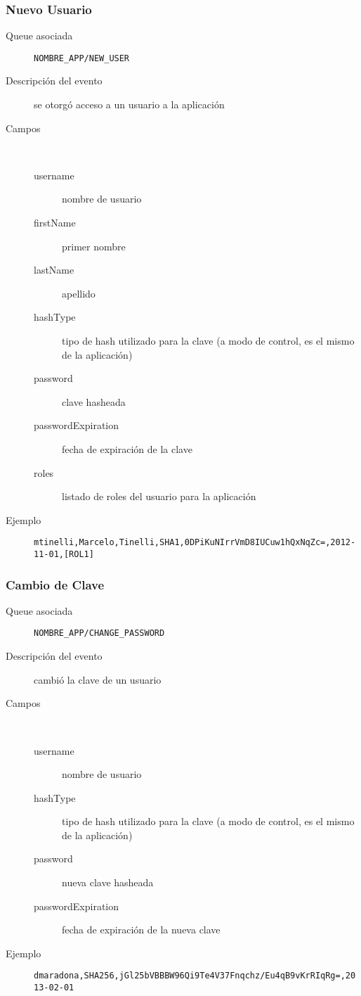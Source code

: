 \subsubsection{Nuevo Usuario}
\begin{description}
  \item[Queue asociada] \texttt{NOMBRE\_APP/NEW\_USER}
  \item[Descripción del evento] se otorgó acceso a un usuario a la aplicación
  \item[Campos] \ 
    \begin{description}
      \item[username] nombre de usuario
      \item[firstName] primer nombre
      \item[lastName] apellido
      \item[hashType] tipo de hash utilizado para la clave (a modo de control, es el mismo de la aplicación)
      \item[password] clave hasheada
      \item[passwordExpiration] fecha de expiración de la clave
      \item[roles] listado de roles del usuario para la aplicación
    \end{description}
  \item[Ejemplo] \texttt{mtinelli,Marcelo,Tinelli,SHA1,0DPiKuNIrrVmD8IUCuw1hQxNqZc=,2012-11-01,[ROL1]}
\end{description}

\subsubsection{Cambio de Clave}
\begin{description}
  \item[Queue asociada] \texttt{NOMBRE\_APP/CHANGE\_PASSWORD}
  \item[Descripción del evento] cambió la clave de un usuario
  \item[Campos] \ 
    \begin{description}
      \item[username] nombre de usuario
      \item[hashType] tipo de hash utilizado para la clave (a modo de control, es el mismo de la aplicación)
      \item[password] nueva clave hasheada
      \item[passwordExpiration] fecha de expiración de la nueva clave
    \end{description}
  \item[Ejemplo] \texttt{dmaradona,SHA256,jGl25bVBBBW96Qi9Te4V37Fnqchz/Eu4qB9vKrRIqRg=,2013-02-01}
\end{description}

